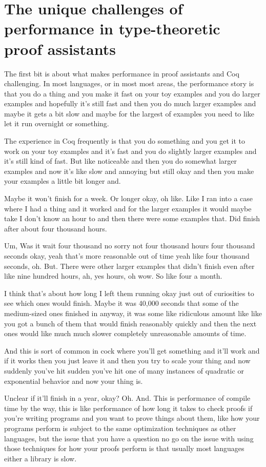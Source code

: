 \chapter{The unique challenges of performance in type-theoretic proof assistants} \label{ch:perf-failures}

The first bit is about what makes performance in proof assistants and Coq challenging. In most languages, or in most most areas, the performance story is that you do a thing and you make it fast on your toy examples and you do larger examples and hopefully it's still fast and then you do much larger examples and maybe it gets a bit slow and maybe for the largest of examples you need to like let it run overnight or something. 

The experience in Coq frequently is that you do something and you get it to work on your toy examples and it's fast and you do slightly larger examples and it's still kind of fast. But like noticeable and then you do somewhat larger examples and now it's like slow and annoying but still okay and then you make your examples a little bit longer and. 

Maybe it won't finish for a week. Or longer okay, oh like. Like I ran into a case where I had a thing and it worked and for the larger examples it would maybe take I don't know an hour to and then there were some examples that. Did finish after about four thousand hours. 

Um, Was it wait four thousand no sorry not four thousand hours four thousand seconds okay, yeah that's more reasonable out of time yeah like four thousand seconds, oh. But. There were other larger examples that didn't finish even after like nine hundred hours, ah, yes hours, oh wow. So like four a month. 

I think that's about how long I left them running okay just out of curiosities to see which ones would finish. Maybe it was 40,000 seconds that some of the medium-sized ones finished in anyway, it was some like ridiculous amount like like you got a bunch of them that would finish reasonably quickly and then the next ones would like much much slower completely unreasonable amounts of time. 

And this is sort of common in cock where you'll get something and it'll work and if it works then you just leave it and then you try to scale your thing and now suddenly you've hit sudden you've hit one of many instances of quadratic or exponential behavior and now your thing is. 

Unclear if it'll finish in a year, okay? Oh. And. This is performance of compile time by the way, this is like performance of how long it takes to check proofs if you're writing programs and you want to prove things about them, like how your programs perform is subject to the same optimization techniques as other languages, but the issue that you have a question no go on the issue with using those techniques for how your proofs perform is that usually most languages either a library is slow. 

